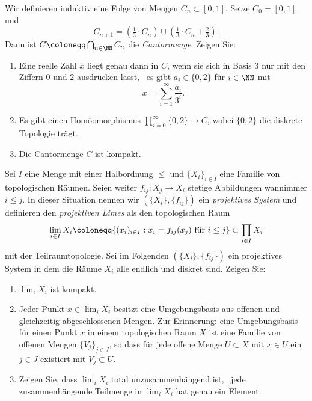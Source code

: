 \begin{exercise}
Wir definieren induktiv eine Folge von Mengen $C_n\subset [0,1]$. Setze $C_0 = [0,1]$ und
\[
C_{n+1} = \left(\tfrac{1}{3}\cdot C_n\right) \cup \left(\tfrac{1}{3}\cdot C_n + \tfrac{2}{3}\right).
\]
Dann ist $C\coloneqq \bigcap_{n\in\NN} C_n$ die \emph{Cantormenge}. Zeigen Sie:
\begin{enumerate}
\item Eine reelle Zahl $x$ liegt genau dann in $C$, wenn sie sich in Basis $3$ nur mit den Ziffern $0$ und $2$ ausdrücken lässt, \ddh~es gibt $a_i\in\{0,2\}$ für $i\in \NN$ mit
\[
x = \sum_{i=1}^\infty \frac{a_i}{3^{i}}.
\]
\item Es gibt einen Homöomorphismus $\prod_{i=0}^\infty\{0,2\} \to C$, wobei $\{0,2\}$ die diskrete Topologie trägt.
\item Die Cantormenge $C$ ist kompakt.
\end{enumerate}
\end{exercise}

\begin{exercise}
Sei $I$ eine Menge mit einer Halbordnung $\leq$ und $\{X_i\}_{i\in I}$ eine Familie von topologischen Räumen. Seien weiter $f_{ij}\colon X_j\to X_i$ stetige Abbildungen wannimmer $i\leq j$. In dieser Situation nennen wir $(\{X_i\}, \{f_{ij}\})$ ein \emph{projektives System} und definieren den \emph{projektiven Limes} als den topologischen Raum
\[
\lim_{i\in I} X_i \coloneqq \{(x_i)_{i\in I} : \textnormal{$x_i = f_{ij}(x_j)$ für $i\leq j$}\}\subset \prod_{i\in I} X_i
\]
mit der Teilraumtopologie. Sei im Folgenden $(\{X_i\},\{f_{ij}\})$ ein projektives System in dem die Räume $X_i$ alle endlich und diskret sind. Zeigen Sie:
\begin{enumerate}
\item $\lim_{i} X_i$ ist kompakt.
\item Jeder Punkt $x\in \lim_i X_i$ besitzt eine Umgebungsbasis aus offenen und gleichzeitig abgeschlossenen Mengen. {\footnotesize Zur Erinnerung: eine Umgebungsbasis für einen Punkt $x$ in einem topologischen Raum $X$ ist eine Familie von offenen Mengen $\{V_j\}_{j\in J}$, so dass für jede offene Menge $U\subset X$ mit $x\in U$ ein $j\in J$ existiert mit $V_j\subset U$.}
\item Zeigen Sie, dass $\lim_i X_i$ total unzusammenhängend ist, \ddh~jede zusammenhängende Teilmenge in $\lim_i X_i$ hat genau ein Element.
\end{enumerate}
\end{exercise}

